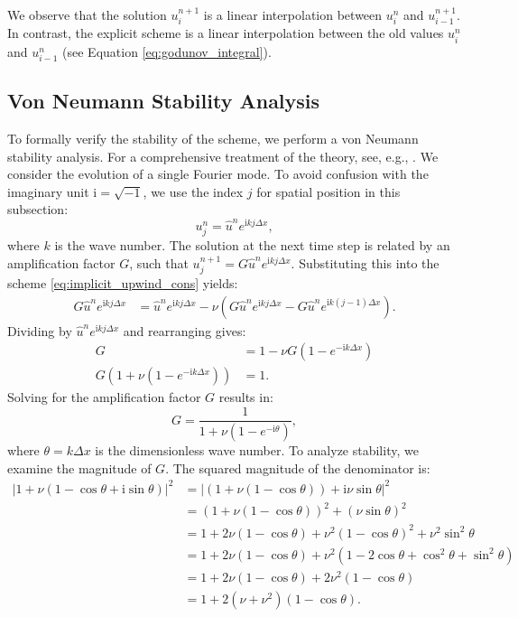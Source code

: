 We observe that the solution \(u_{i}^{n+1}\) is a linear interpolation between \(u_{i}^{n}\) and \(u_{i-1}^{n+1}\).
In contrast, the explicit scheme is a linear interpolation between the old values \(u_{i}^{n}\) and \(u_{i-1}^{n}\) (see Equation \eqref{eq:godunov_integral}).

\subsection{Von Neumann Stability Analysis}
To formally verify the stability of the scheme, we perform a von Neumann stability analysis. 
For a comprehensive treatment of the theory, see, e.g., \cite{hirsch2007numerical, leveque2002finite}.
We consider the evolution of a single Fourier mode. 
To avoid confusion with the imaginary unit \( \mathrm{i} = \sqrt{-1} \), we use the index \( j \) for spatial position in this subsection:
\[
    u_j^n = \hat{u}^n e^{\mathrm{i} k j \Delta x},
\]
where \(k\) is the wave number.
The solution at the next time step is related by an amplification factor \(G\), such that \(u_j^{n+1} = G \hat{u}^n e^{\mathrm{i} k j \Delta x}\). 
Substituting this into the scheme \eqref{eq:implicit_upwind_cons} yields:
\begin{align*}
    G \hat{u}^n e^{\mathrm{i} k j \Delta x} &= \hat{u}^n e^{\mathrm{i} k j \Delta x} - \nu \left( G \hat{u}^n e^{\mathrm{i} k j \Delta x} - G \hat{u}^n e^{\mathrm{i} k (j-1) \Delta x} \right).
\end{align*}
Dividing by \(\hat{u}^n e^{\mathrm{i} k j \Delta x}\) and rearranging gives:
\begin{align*}
    G &= 1 - \nu G (1 - e^{-\mathrm{i} k \Delta x}) \\
    G (1 + \nu(1 - e^{-\mathrm{i} k \Delta x})) &= 1.
\end{align*}
Solving for the amplification factor \(G\) results in:
\begin{equation}
    \label{eq:implicit_upwind_g}
    G = \frac{1}{1 + \nu(1 - e^{-\mathrm{i}\theta})},
\end{equation}
where \(\theta = k \Delta x\) is the dimensionless wave number. 
To analyze stability, we examine the magnitude of \(G\). The squared magnitude of the denominator is:
\begin{align*}
    |1 + \nu(1 - \cos\theta + \mathrm{i}\sin\theta)|^2 &= |(1 + \nu(1-\cos\theta)) + \mathrm{i}\nu\sin\theta|^2 \\
    &= (1 + \nu(1-\cos\theta))^2 + (\nu\sin\theta)^2 \\
    &= 1 + 2\nu(1-\cos\theta) + \nu^2(1-\cos\theta)^2 + \nu^2\sin^2\theta \\
    &= 1 + 2\nu(1-\cos\theta) + \nu^2(1 - 2\cos\theta + \cos^2\theta + \sin^2\theta) \\
    &= 1 + 2\nu(1-\cos\theta) + 2\nu^2(1 - \cos\theta) \\
    &= 1 + 2(\nu + \nu^2)(1-\cos\theta).
\end{align*}
